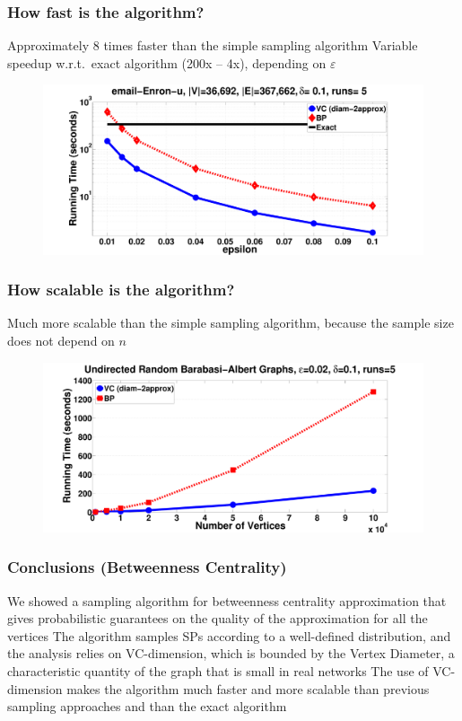 \begin{frame}
  \frametitle{How fast is the algorithm?}
  Approximately 8 times faster than the simple sampling algorithm
  \vfill
  Variable speedup w.r.t.~exact algorithm (200x -- 4x), depending on
  $\varepsilon$
  \vfill
  \begin{figure}[H]
    \centering
    \includegraphics[width=\textwidth]{imgs/email-Enron-time.pdf}
  \end{figure}
\end{frame}

\begin{frame}
  \frametitle{How scalable is the algorithm?}
  Much more scalable than the simple sampling algorithm, because the sample
  size does not depend on $n$
  \vfill
  \begin{figure}[H]
    \centering
    \includegraphics[width=\textwidth]{imgs/random-time.pdf}
  \end{figure}
\end{frame}

\begin{frame}
  \frametitle{Conclusions (Betweenness Centrality)}
  \vfill
  We showed a sampling algorithm for betweenness centrality approximation that
  gives probabilistic guarantees on the quality of the approximation for all
  the vertices
  \vfill
  The algorithm samples SPs according to a well-defined distribution, and
  the analysis relies on VC-dimension, which is bounded by the Vertex Diameter,
  a characteristic quantity of the graph that is small in real networks
  \vfill
  The use of VC-dimension makes the algorithm much faster and more scalable
  than previous sampling approaches and than the exact algorithm
\end{frame}

